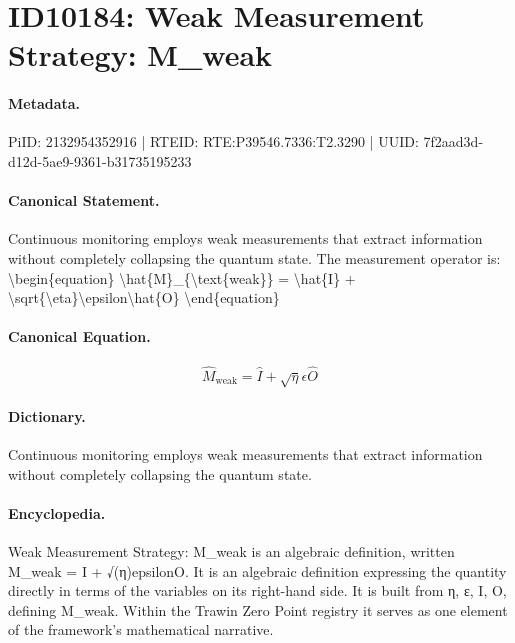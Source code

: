 \section*{ID10184: Weak Measurement Strategy: M\_weak}
\paragraph{Metadata.}
PiID: 2132954352916 | RTEID: RTE:P39546.7336:T2.3290 | UUID: 7f2aad3d-d12d-5ae9-9361-b31735195233

\paragraph{Canonical Statement.}
Continuous monitoring employs weak measurements that extract information without completely collapsing the quantum state. The measurement operator is: \textbackslash{}begin\{equation\} \textbackslash{}hat\{M\}\_\{\textbackslash{}text\{weak\}\} = \textbackslash{}hat\{I\} + \textbackslash{}sqrt\{\textbackslash{}eta\}\textbackslash{}epsilon\textbackslash{}hat\{O\} \textbackslash{}end\{equation\}

\paragraph{Canonical Equation.}
\[
\hat{M}_{\text{weak}} = \hat{I} + \sqrt{\eta}\epsilon\hat{O}
\]

\paragraph{Dictionary.}
Continuous monitoring employs weak measurements that extract information without completely collapsing the quantum state.

\paragraph{Encyclopedia.}
Weak Measurement Strategy: M\_weak is an algebraic definition, written M\_weak = I + √(η)epsilonO. It is an algebraic definition expressing the quantity directly in terms of the variables on its right-hand side. It is built from η, ε, I, O, defining M\_weak. Within the Trawin Zero Point registry it serves as one element of the framework's mathematical narrative.
